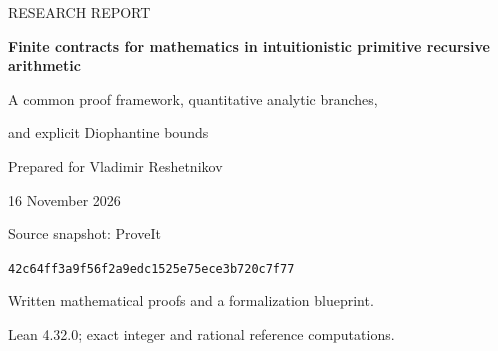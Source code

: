\documentclass[11pt,a4paper]{article}
\theoremstyle{definition}
\theoremstyle{remark}
\begin{document}
\begin{titlepage}
\thispagestyle{empty}
\vspace*{1.4cm}
{\small\sffamily\color{ink}RESEARCH REPORT\par}
\vspace{0.7cm}
{\Huge\bfseries\color{ink}Finite contracts for mathematics in intuitionistic primitive recursive arithmetic\par}
\vspace{0.8cm}
{\Large A common proof framework, quantitative analytic branches,\par
and explicit Diophantine bounds\par}
\vspace{1cm}
{\large Prepared for Vladimir Reshetnikov\par}
\vspace{0.25cm}
{16 November 2026\par}
\vspace{1.1cm}
\begin{abstract}
We develop a reusable arithmetic interface for finite mathematical objects,
fixed primitive recursive approximation families, and certified numerical
constructions.  Its core is a direct proof of bounded-formula
Booleanization, a guarded bounded-loop rule, and composition of finite
observation contracts.  Every induction is reduced to a quantifier-free
invariant, while global hypotheses remain explicit first-order assumptions.

Applications include an explicit stable-window selector for represented
monotone sequences; a convergent implicit power-series branch for arbitrary
primitive recursive Cauchy coefficients on a certified regular chart,
including a primitive recursive certificate producer from simple-root
data; and an all-exponent power-gap theorem giving integral-point height
bounds, a certificate constructor, bounded-denominator transport, and a
complete uniform family classification.

The report distinguishes these results from the genuine remaining
obstructions in the source collection.  Compiled Lean lemmas, an actual
embedded iPRA induction proof, executable exact-arithmetic reference code,
and precise unproved Lean targets accompany the full written arguments.
The general compiler and the object-theory derivations of the major
applications remain explicit formalization tasks.
\end{abstract}
\vfill
\noindent\small
Source snapshot: ProveIt\par
\noindent\texttt{42c64ff3a9f56f2a9edc1525e75ece3b720c7f77}\par
\medskip
\noindent Written mathematical proofs and a formalization blueprint.\par
\noindent Lean 4.32.0; exact integer and rational reference computations.
\end{titlepage}

\tableofcontents
\clearpage









\clearpage

\clearpage

\end{document}
